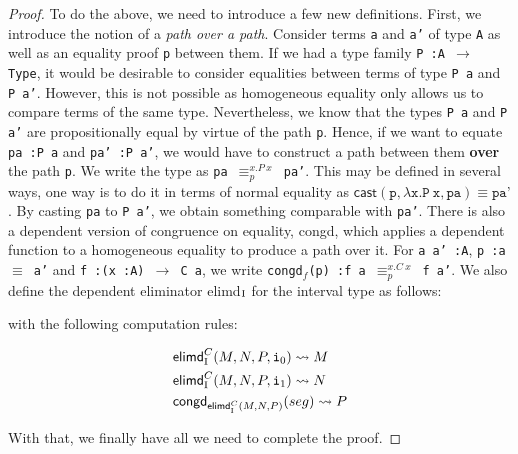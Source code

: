 \documentclass[12pt,twoside,maitrise]{dms}
\theoremstyle{definition}
\numberwithin{equation}{section}
\numberwithin{table}{chapter}
\numberwithin{figure}{chapter}
\newcommand\kw[1] {\textsf{#1}}
\newcommand\id[1] {\texttt{#1}}
\newcommand\fn[1] {\texttt{#1}}
\begin{document}
\begin{proof}
To do the above, we need to introduce a few new definitions. First, we introduce
the notion of a \emph{path over a path}\cite{licata2015cubical}. Consider terms
\id{a} and \id{a'} of type \id{A} as well as an equality proof \id{p} between
them. If we had a type family \fn{P :\@ A $\rightarrow$ Type}, it would be
desirable to consider equalities between terms of type \fn{P a} and \fn{P a'}.
However, this is not possible as homogeneous equality only allows us to compare
terms of the same type. Nevertheless, we know that the types \fn{P a} and \fn{P
  a'} are propositionally equal by virtue of the path \id{p}. Hence, if we want
to equate \fn{pa :\@ P a} and \fn{pa' :\@ P a'}, we would have to
construct a path between them \textbf{over} the path \id{p}. We write the type
as \fn{pa $\equiv^{x. P \ x}_{p}$ pa'}. This may be defined in several ways, one
way is to do it in terms of normal equality as $\kw{cast}(\id{p}, \lambda \id{x}
. \id{P} \ \id{x}, \id{pa}) \equiv \id{pa'}$. By casting \id{pa} to \id{P a'},
we obtain something comparable with \id{pa'}. There is also a dependent version
of congruence on equality, \kw{congd}, which applies a dependent function to a
homogeneous equality to produce a path over it. For \fn{a a' :\@ A}, \fn{p
  :\@ a $\equiv$ a'} and \fn{f :\@ (x :\@ A) $\rightarrow$ C a}, we write
\fn{\kw{congd}$_{f}$(p) :\@ f a $\equiv^{x. C \ x}_{p}$ f a'}. We also
define the dependent eliminator \kw{elimd}$_{\mathrm{I}}$ for the interval type as
follows:

\begin{prooftree*}
   \infer4{\oftype{\ctx, \oftype{i}{\bI}}{\kw{elimd}_{\bI}^{C} (M, N, P, i)}{C \ i}}
\end{prooftree*}


with the following computation rules:

\begin{align*}
  & \kw{elimd}_{\bI}^{C}(M, N, P, \ileft) \rightsquigarrow{} M \\
  & \kw{elimd}_{\bI}^{C}(M, N, P, \iright) \rightsquigarrow{} N \\
  & \kw{congd}_{\kw{elimd}_{\bI}^{C}(M, N, P)}(seg) \rightsquigarrow{} P
\end{align*}


With that, we finally have all we need to complete the proof.


\end{proof}
\end{document}

